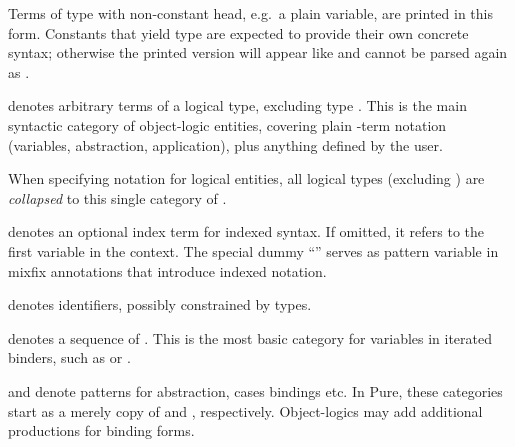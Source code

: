 \begin{isabellebody}
\begin{isamarkuptext}
\begin{description}
  Terms of type  with non-constant head, e.g.\ a plain
  variable, are printed in this form.  Constants that yield type  are expected to provide their own concrete syntax; otherwise
  the printed version will appear like \hyperlink{syntax.inner.logic}{\mbox{}} and
  cannot be parsed again as \hyperlink{syntax.inner.prop}{\mbox{}}.

  \item {}\hyperlink{syntax.inner.logic}{\mbox{}} denotes arbitrary terms of a
  logical type, excluding type .  This is the main
  syntactic category of object-logic entities, covering plain -term notation (variables, abstraction, application), plus
  anything defined by the user.

  When specifying notation for logical entities, all logical types
  (excluding ) are \emph{collapsed} to this single category
  of \hyperlink{syntax.inner.logic}{\mbox{}}.

  \item {}\hyperlink{syntax.inner.index}{\mbox{}} denotes an optional index term for
  indexed syntax.  If omitted, it refers to the first \hyperlink{keyword.structure}{\mbox{}} variable in the context.  The special dummy ``'' serves as pattern variable in mixfix annotations that
  introduce indexed notation.

  \item {}\hyperlink{syntax.inner.idt}{\mbox{}} denotes identifiers, possibly
  constrained by types.

  \item {}\hyperlink{syntax.inner.idts}{\mbox{}} denotes a sequence of \hyperlink{syntax.inner.idt}{\mbox{}}.  This is the most basic category for variables in
  iterated binders, such as  or .

  \item {}\hyperlink{syntax.inner.pttrn}{\mbox{}} and \hyperlink{syntax.inner.pttrns}{\mbox{}}
  denote patterns for abstraction, cases bindings etc.  In Pure, these
  categories start as a merely copy of \hyperlink{syntax.inner.idt}{\mbox{}} and
  \hyperlink{syntax.inner.idts}{\mbox{}}, respectively.  Object-logics may add
  additional productions for binding forms.


\end{description}
\end{isamarkuptext}
\end{isabellebody}
